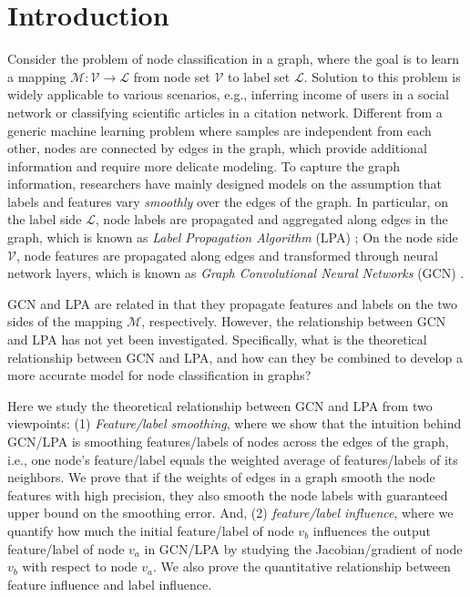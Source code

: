 \documentclass{article}
\begin{document}
\section{Introduction}
	Consider the problem of node classification in a graph, where the goal is to learn a mapping $\mathcal M: \mathcal V \rightarrow \mathcal L$ from node set $\mathcal V$ to label set $\mathcal L$.
	Solution to this problem is widely applicable to various scenarios, e.g., inferring income of users in a social network or classifying scientific articles in a citation network.
	Different from a generic machine learning problem where samples are independent from each other, nodes are connected by edges in the graph, which provide additional information and require more delicate modeling.
	To capture the graph information, researchers have mainly designed models on the assumption that labels and features vary \textit{smoothly} over the edges of the graph. 
	In particular, on the label side $\mathcal L$, node labels are propagated and aggregated along edges in the graph, which is known as \textit{Label Propagation Algorithm} (LPA) \citep{zhu2005semi, zhou2004learning, zhang2007hyperparameter, wang2008label, karasuyama2013manifold, gong2017label, liu2018learning};
	On the node side $\mathcal V$, node features are propagated along edges and transformed through neural network layers, which is known as \textit{Graph Convolutional Neural Networks} (GCN) \citep{kipf2017semi, hamilton2017inductive, li2018deeper, xu2018representation,liao2019lanczosnet,xu2019powerful,qu2019gmnn}.
	
	GCN and LPA are related in that they propagate features and labels on the two sides of the mapping $\mathcal M$, respectively.
	However, the relationship between GCN and LPA has not yet been investigated.
	Specifically, what is the theoretical relationship between GCN and LPA, and how can they be combined to develop a more accurate model for node classification in graphs?
	
	Here we study the theoretical relationship between GCN and LPA from two viewpoints:
	(1) \textit{Feature/label smoothing}, where we show that the intuition behind GCN/LPA is smoothing features/labels of nodes across the edges of the graph, i.e., one node's feature/label equals the weighted average of features/labels of its neighbors.
	We prove that if the weights of edges in a graph smooth the node features with high precision, they also smooth the node labels with guaranteed upper bound on the smoothing error.
	And, (2) \textit{feature/label influence},
	where we quantify how much the initial feature/label of node $v_b$ influences the output feature/label of node $v_a$ in GCN/LPA by studying the Jacobian/gradient of node $v_b$ with respect to node $v_a$.
	We also prove the quantitative relationship between feature influence and label influence.
	
\end{document}
